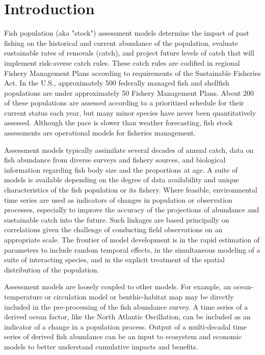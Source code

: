 
\section{Introduction}\label{sec:intro}

Fish population (aka "stock")  assessment models determine the impact of past fishing on the historical and current abundance of the population, evaluate sustainable rates of removals (catch), and project future levels of catch that will implement risk-averse catch rules.  These catch rules are codified in regional Fishery Management Plans according to requirements of the Sustainable Fisheries Act.  In the U.S., approximately 500 federally managed fish and shellfish populations are under approximately 50 Fishery Management Plans.  About 200 of these populations are assessed according to a prioritized schedule for their current status each year, but many minor species have never been quantitatively assessed.  Although the pace is slower than weather forecasting, fish stock assessments are operational models for fisheries management.

Assessment models typically assimilate several decades of annual catch, data on fish abundance from diverse surveys and fishery sources, and biological information regarding fish body size and the proportions at age.  A suite of models is available depending on the degree of data availability and unique characteristics of the fish population or its fishery.  Where feasible, environmental time series are used as indicators of changes in population or observation processes, especially to improve the accuracy of the projections of abundance and sustainable catch into the future.  Such linkages are based principally on correlations given the challenge of conducting field observations on an appropriate scale.  The frontier of model development is in the rapid estimation of parameters to include random temporal effects, in the simultaneous modeling of a suite of interacting species, and in the explicit treatment of the spatial distribution of the population.

Assessment models are loosely coupled to other models. For example, an ocean-temperature or circulation model or benthic-habitat map may be directly included in the pre-processing of the fish abundance survey.  A time series of a derived ocean factor, like the North Atlantic Oscillation, can be included as an indicator of a change in a population process.  Output of a multi-decadal time series of derived fish abundance can be an input to ecosystem and economic models to better understand cumulative impacts and benefits. 

